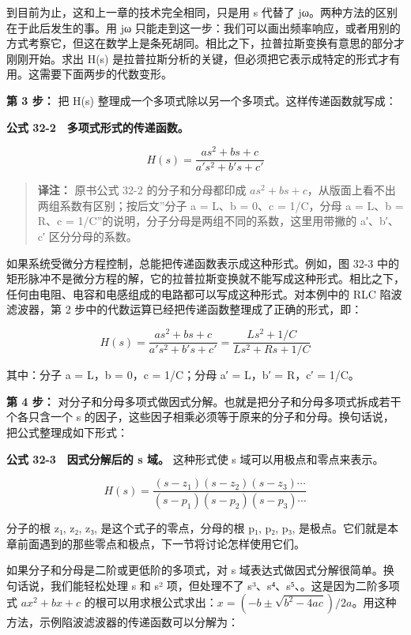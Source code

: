 到目前为止，这和上一章的技术完全相同，只是用 s 代替了
jω。两种方法的区别在于此后发生的事。用 jω
只能走到这一步：我们可以画出频率响应，或者用别的方式考察它，但这在数学上是条死胡同。相比之下，拉普拉斯变换有意思的部分才刚刚开始。求出
H(s)
是拉普拉斯分析的关键，但必须把它表示成特定的形式才有用。这需要下面两步的代数变形。

\textbf{第 3 步：} 把 H(s)
整理成一个多项式除以另一个多项式。这样传递函数就写成：

\textbf{公式 32-2　多项式形式的传递函数。}

\[H(s) = \frac{a s^2 + b s + c}{a' s^2 + b' s + c'}\]

\begin{quote}
\textbf{译注：} 原书公式 32-2 的分子和分母都印成
\(as^2 + bs + c\)，从版面上看不出两组系数有区别；按后文''分子 a = L、b =
0、c = 1/C，分母 a = L、b = R、c =
1/C''的说明，分子分母是两组不同的系数，这里用带撇的 a′、b′、c′
区分分母的系数。
\end{quote}

如果系统受微分方程控制，总能把传递函数表示成这种形式。例如，图 32-3
中的矩形脉冲不是微分方程的解，它的拉普拉斯变换就不能写成这种形式。相比之下，任何由电阻、电容和电感组成的电路都可以写成这种形式。对本例中的
RLC 陷波滤波器，第 2
步中的代数运算已经把传递函数整理成了正确的形式，即：

\[H(s) = \frac{a s^2 + b s + c}{a' s^2 + b' s + c'} = \frac{Ls^2 + 1/C}{Ls^2 + Rs + 1/C}\]

其中：分子 a = L，b = 0，c = 1/C；分母 a′ = L，b′ = R，c′ = 1/C。

\textbf{第 4 步：}
对分子和分母多项式做因式分解。也就是把分子和分母多项式拆成若干个各只含一个
s
的因子，这些因子相乘必须等于原来的分子和分母。换句话说，把公式整理成如下形式：

\textbf{公式 32-3　因式分解后的 s 域。} 这种形式使 s
域可以用极点和零点来表示。

\[H(s) = \frac{(s - z_1)(s - z_2)(s - z_3)\cdots}{(s - p_1)(s - p_2)(s - p_3)\cdots}\]

分子的根 z₁, z₂, z₃,  是这个式子的零点，分母的根 p₁, p₂, p₃,
是极点。它们就是本章前面遇到的那些零点和极点，下一节将讨论怎样使用它们。

如果分子和分母是二阶或更低阶的多项式，对 s
域表达式做因式分解很简单。换句话说，我们能轻松处理 s 和 s²
项，但处理不了 s³、s⁴、s⁵、。这是因为二阶多项式
\(ax^2 + bx + c\)
的根可以用求根公式求出：\(x = \left(-b \pm \sqrt{b^2 - 4ac}\right)/2a\)。用这种方法，示例陷波滤波器的传递函数可以分解为：

